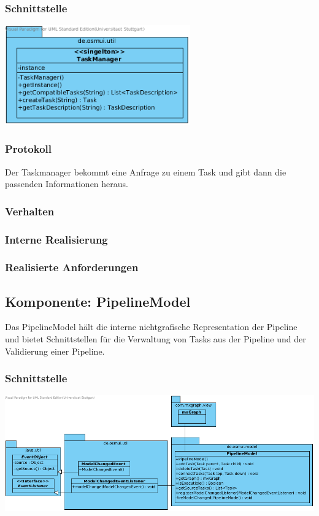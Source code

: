 \documentclass[a4paper,12pt]{scrartcl}
\begin{document}
\subsubsection{Schnittstelle}
\begin{center}
\includegraphics[width=8cm]{Schnittstelle_TaskManager.png}
\end{center}
\subsubsection{Protokoll}
Der Taskmanager bekommt eine Anfrage zu einem Task und gibt dann die passenden Informationen heraus.
\subsubsection{Verhalten}
\subsubsection{Interne Realisierung}
\subsubsection{Realisierte Anforderungen}

\newpage
\subsection{Komponente: PipelineModel}
Das PipelineModel hält die interne nichtgrafische Representation der Pipeline und bietet Schnittstellen für die Verwaltung von Tasks aus der Pipeline und der Validierung einer Pipeline. 
\subsubsection{Schnittstelle}
\begin{center}
\includegraphics[width=17cm]{Schnittstelle_PipelineModel.png}
\end{center}
\end{document}
